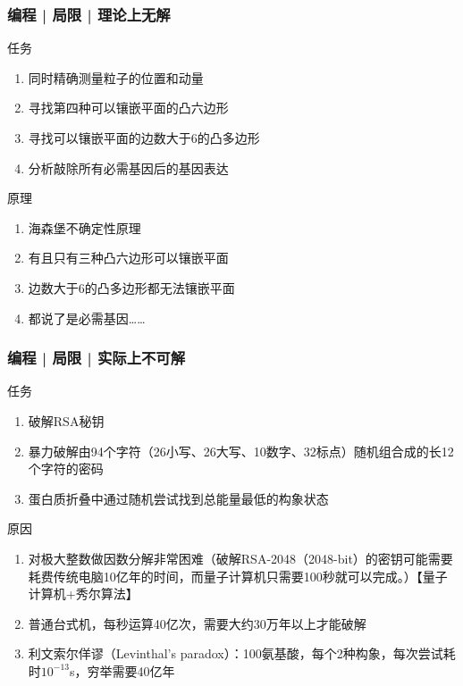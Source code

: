 \begin{frame}
  \frametitle{编程 | 局限 | 理论上无解}
  \begin{block}{任务}
    \begin{enumerate}
      \item<1-> 同时精确测量粒子的位置和动量
      \item<2-> 寻找第四种可以镶嵌平面的凸六边形
      \item<3-> 寻找可以镶嵌平面的边数大于6的凸多边形
      \item<4-> 分析敲除所有必需基因后的基因表达
    \end{enumerate}
  \end{block}
  \begin{block}{原理}
    \begin{enumerate}
      \item<1-> 海森堡不确定性原理
      \item<2-> 有且只有三种凸六边形可以镶嵌平面
      \item<3-> 边数大于6的凸多边形都无法镶嵌平面
      \item<4-> 都说了是必需基因……
    \end{enumerate}
  \end{block}
\end{frame}

\begin{frame}
  \frametitle{编程 | 局限 | 实际上不可解}
  \begin{block}{任务}
    \begin{enumerate}
      \item<1-> 破解RSA秘钥
      \item<2-> 暴力破解由94个字符（26小写、26大写、10数字、32标点）随机组合成的长12个字符的密码
      \item<3-> 蛋白质折叠中通过随机尝试找到总能量最低的构象状态
    \end{enumerate}
  \end{block}
  \begin{block}{原因}
    \begin{enumerate}
      \item<1-> 对极大整数做因数分解非常困难（破解RSA-2048（2048-bit）的密钥可能需要耗费传统电脑10亿年的时间，而量子计算机只需要100秒就可以完成。）【量子计算机+秀尔算法】
      \item<2-> 普通台式机，每秒运算40亿次，需要大约30万年以上才能破解
      \item<3-> 利文索尔佯谬（Levinthal's paradox）：100氨基酸，每个2种构象，每次尝试耗时$10^{-13}$s，穷举需要40亿年
    \end{enumerate}
  \end{block}
\end{frame}

